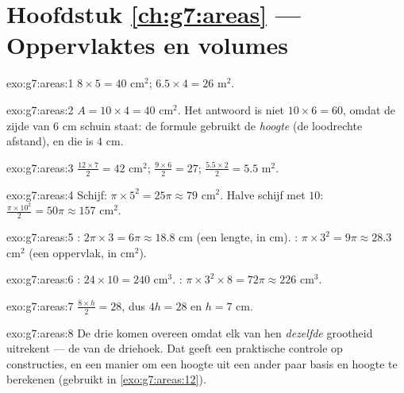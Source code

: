 \section*{Hoofdstuk \ref{ch:g7:areas} --- Oppervlaktes en volumes}

\begin{solution}{exo:g7:areas:1}
$8 \times 5 = 40$ cm$^2$; \qquad $6.5 \times 4 = 26$ m$^2$.
\end{solution}

\begin{solution}{exo:g7:areas:2}
$A = 10 \times 4 = 40$ cm$^2$. Het antwoord is niet $10 \times 6 = 60$, omdat de
zijde van $6$ cm schuin staat: de formule gebruikt de \emph{hoogte} (de loodrechte
afstand), en die is $4$ cm.
\end{solution}

\begin{solution}{exo:g7:areas:3}
$\frac{12 \times 7}{2} = 42$ cm$^2$; \quad
$\frac{9 \times 6}{2} = 27$; \quad
$\frac{5.5 \times 2}{2} = 5.5$ m$^2$.
\end{solution}

\begin{solution}{exo:g7:areas:4}
Schijf: $\pi \times 5^2 = 25\pi \approx 79$ cm$^2$. Halve schijf met  $10$:
$\frac{\pi \times 10^2}{2} = 50\pi \approx 157$ cm$^2$.
\end{solution}

\begin{solution}{exo:g7:areas:5}
: $2\pi \times 3 = 6\pi \approx 18.8$ cm (een lengte, in cm). :
$\pi \times 3^2 = 9\pi \approx 28.3$ cm$^2$ (een oppervlak, in cm$^2$).
\end{solution}

\begin{solution}{exo:g7:areas:6}
: $24 \times 10 = 240$ cm$^3$. :
$\pi \times 3^2 \times 8 = 72\pi \approx 226$ cm$^3$.
\end{solution}

\begin{solution}{exo:g7:areas:7}
$\frac{8 \times h}{2} = 28$, dus $4h = 28$ en $h = 7$ cm.
\end{solution}

\begin{solution}{exo:g7:areas:8}
De drie  komen overeen omdat elk van hen \emph{dezelfde} grootheid uitrekent
--- de  van de driehoek. Dat geeft een praktische controle op constructies,
en een manier om een hoogte uit een ander paar basis en hoogte te berekenen (gebruikt
in \cref{exo:g7:areas:12}).
\end{solution}

